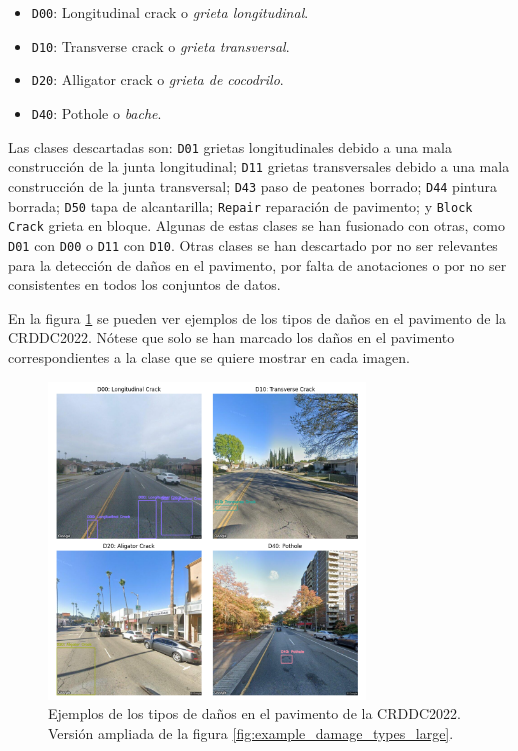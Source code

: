 \begin{itemize}
    \item \texttt{D00}: Longitudinal crack o \textit{grieta longitudinal}.
    \item \texttt{D10}: Transverse crack o \textit{grieta transversal}.
    \item \texttt{D20}: Alligator crack o \textit{grieta de cocodrilo}.
    \item \texttt{D40}: Pothole o \textit{bache}.
\end{itemize}

Las clases descartadas son: \texttt{D01} grietas longitudinales debido a una mala construcción de la junta longitudinal; \texttt{D11} grietas transversales debido a una mala construcción de la junta transversal; \texttt{D43} paso de peatones borrado; \texttt{D44} pintura borrada; \texttt{D50} tapa de alcantarilla; \texttt{Repair} reparación de pavimento; y \texttt{Block Crack} grieta en bloque. Algunas de estas clases se han fusionado con otras, como \texttt{D01} con \texttt{D00} o \texttt{D11} con \texttt{D10}. Otras clases se han descartado por no ser relevantes para la detección de daños en el pavimento, por falta de anotaciones o por no ser consistentes en todos los conjuntos de datos.

En la figura \ref{fig:example_damage_types} se pueden ver ejemplos de los tipos de daños en el pavimento de la CRDDC2022. Nótese que solo se han marcado los daños en el pavimento correspondientes a la clase que se quiere mostrar en cada imagen.

\begin{figure}[H]
    \centering
    \includegraphics[width=0.75\textwidth]{img/example_damage_types_grid.png}
    \caption{Ejemplos de los tipos de daños en el pavimento de la CRDDC2022. Versión ampliada de la figura \ref{fig:example_damage_types_large}.}
    \label{fig:example_damage_types}
\end{figure}

